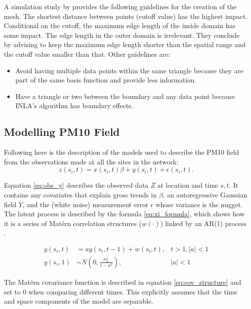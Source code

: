 \documentclass{article}
\begin{document}
	A simulation study by \citet{Righetto2020} provides the following guidelines for the creation of the mesh.  The shortest distance between points (cutoff value) has the highest impact.  Conditional on the cutoff, the maximum edge length of the inside domain has some impact.  The edge length in the outer domain is irrelevant.  They conclude by advising to keep the maximum edge length shorter than the spatial range and the cutoff value smaller than that.  Other guidelines are:
	\begin{itemize}
		\item Avoid having multiple data points within the same triangle because they are part of the same basis function and provide less information.
		\item Have a triangle or two between the boundary and any data point because \ac{INLA}'s algorithm has boundary effects.
	\end{itemize} 
	
	
	
	
	
	
	\subsection{Modelling PM10 Field}\label{subsec:modelling PM10}
	Following \cite{cameletti2011spatio} here is the description of the models used to describe the \ac{PM10} field from the observations made at all the sites in the network:
	\begin{equation} \label{eq:obs_y}
		z(s_i,t) = x(s_i,t)\beta + y(s_i, t) + \epsilon(s_i,t).
	\end{equation}
	
	Equation \ref{eq:obs_y} describes the observed data $Z$ at location and time ${s,t}$.  It contains any covariates that explain gross trends in $\beta$, an autoregressive Gaussian field $Y$, and the (white noise) measurement error $\epsilon$ whose variance is the nugget.  The latent process is described by the formula \ref{eq:xi_formula}, which shows how it is a series of Mat\'{e}rn correlation structures ($w(\cdot)$) linked by an \ac{AR}(1) process \citep{gomezGitBook, cameletti2011spatio}.
	
	\begin{align} \label{eq:xi_formula}
		y(s_i, t) &= ay(s_i, t-1) + w(s_i,t) , &t>1, |a| < 1 \\
		y (s_i, 1) &\sim N(0, \frac{\sigma_w^{2}}{1-a^2}) , &|a| < 1 \nonumber
	\end{align}
	
	The Mat\'{e}rn covariance function is described in equation \ref{eq:cov_structure} and set to 0 when comparing different times.  This explicitly assumes that the time and space components of the model are separable. %
	
\end{document}
